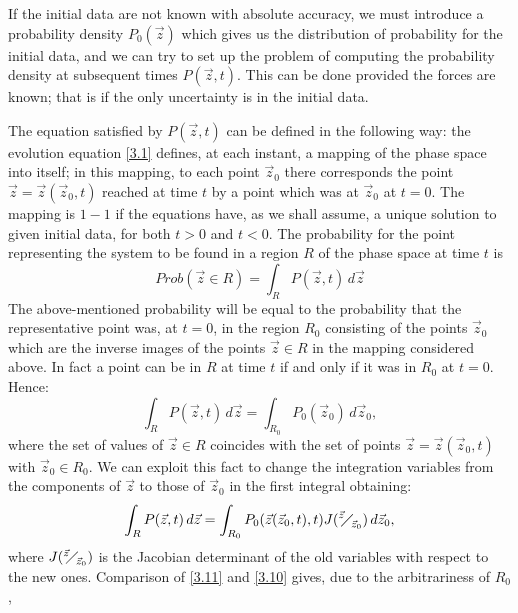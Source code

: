 If the initial data are not known with absolute accuracy, we must introduce a probability density \(P_0(\vec{z})\) which gives us the distribution of probability for the initial data, and we can try to set up the problem of computing the probability density at subsequent times \(P(\vec{z}, t)\). This can be done provided the forces are known; that is if the only uncertainty is in the initial data. 

The equation satisfied by \(P(\vec{z}, t)\) can be defined in the following way: the evolution equation \eqref{3.1} defines, at each instant, a mapping of the phase space into itself; in this mapping, to each point \(\vec{z}_0\) there corresponds the point \(\vec{z} = \vec{z}(\vec{z}_0, t)\) reached at time \(t\) by a point which was at \(\vec{z}_0\) at \(t=0\). The mapping is \(1-1\) if the equations have, as we shall assume, a unique solution to given initial data, for both \(t>0\) and \(t<0\). The probability for the point representing the system to be found in a region \(R\) of the phase space at time \(t\) is 
\begin{equation}
    Prob(\vec{z} \in R) = \int_R P(\vec{z}, t) \, d\vec{z}
    \label{3.9}
\end{equation}
The above-mentioned probability will be equal to the probability that the representative point was, at \(t=0\), in the region \(R_0\) consisting of the points \(\vec{z}_0\) which are the inverse images of the points \(\vec{z} \in R\) in the mapping considered above. In fact a point can be in \(R\) at time \(t\) if and only if it was in \(R_0\) at \(t=0\). Hence:
\begin{equation}
    \int_R P(\vec{z}, t) \, d\vec{z} = \int_{R_0} P_0(\vec{z}_0) \, d\vec{z}_0,
    \label{3.10}
\end{equation}
where the set of values of \(\vec{z} \in R\) coincides with the set of points \(\vec{z} = \vec{z}(\vec{z}_0, t)\) with \(\vec{z}_0 \in R_0\). We can exploit this fact to change the integration variables from the components of \(\vec{z}\) to those of \(\vec{z}_0\) in the first integral obtaining:
\begin{equation}
    \int_R P(\vec{z}, t) \, d\vec{z} = \int_{R_0} P_0(\vec{z}(\vec{z}_0, t), t) J({}^{\vec{z}}{\mskip -5mu\diagup\mskip -3mu}_{\vec{z}_0}) \, d\vec{z}_0, \label{3.11}
\end{equation}
where \(J({}^{\vec{z}}{\mskip -5mu\diagup\mskip -3mu}_{\vec{z}_0})\) is the Jacobian determinant of the old variables with respect to the new ones. Comparison of \eqref{3.11} and \eqref{3.10} gives, due to the arbitrariness of \(R_0\), 
